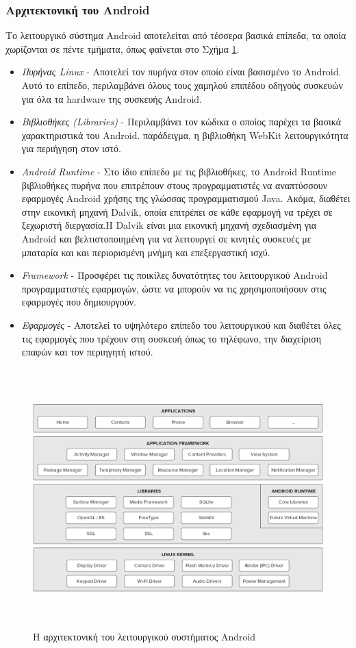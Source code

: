 \documentclass[12pt,twoside,openright]{report}
\begin{document}
\subsubsection{Αρχιτεκτονική του \lt Android\gt}
Το λειτουργικό σύστημα \lt Android \gt αποτελείται από τέσσερα βασικά επίπεδα, τα οποία χωρίζονται σε πέντε τμήματα, όπως φαίνεται στο Σχήμα \ref{fig:androidArc}\cite{Lee:2011}.
\begin{itemize}
\item\emph{Πυρήνας \lt Linux\gt} - Αποτελεί τον πυρήνα στον οποίο είναι βασισμένο το \lt Android\gt. Αυτό το επίπεδο, περιλαμβάνει όλους τους χαμηλού επιπέδου οδηγούς συσκευών για όλα τα \lt hardware  της συσκευής \lt Android\gt.
\item\emph{Βιβλιοθήκες \lt (Libraries)\gt} - Περιλαμβάνει τον κώδικα ο οποίος παρέχει τα βασικά χαρακτηριστικά του \lt Android.  παράδειγμα, η βιβλιοθήκη \lt WebKit  λειτουργικότητα για περιήγηση στον ιστό.
\item\emph{\lt Android Runtime\gt} - Στο ίδιο επίπεδο με τις βιβλιοθήκες, το \lt Android Runtime  βιβλιοθήκες πυρήνα που επιτρέπουν στους προγραμματιστές να αναπτύσσουν εφαρμογές \lt Android  χρήσης της γλώσσας προγραμματισμού \lt Java\gt. Ακόμα, διαθέτει στην εικονική μηχανή \lt Dalvik,  οποία επιτρέπει σε κάθε εφαρμογή να τρέχει σε ξεχωριστή διεργασία.Η Dalvik είναι μια εικονική μηχανή σχεδιασμένη για Android και βελτιστοποιημένη για να λειτουργεί σε κινητές συσκευές με μπαταρία και και περιορισμένη μνήμη και επεξεργαστική ισχύ. 
\item\emph{\lt Framework } - Προσφέρει τις ποικίλες δυνατότητες του λειτουργικού \lt Android  προγραμματιστές εφαρμογών, ώστε να μπορούν να τις χρησιμοποιήσουν στις εφαρμογές που δημιουργούν. 
\item\emph{Εφαρμογές} - Αποτελεί το υψηλότερο επίπεδο του λειτουργικού και διαθέτει όλες τις εφαρμογές που τρέχουν στη συσκευή όπως το τηλέφωνο, την διαχείριση επαφών και τον περιηγητή ιστού.
\end{itemize}
\begin{figure}[H]
\centering
\includegraphics[height=10cm]{images/android_arc}
\caption{Η αρχιτεκτονική του λειτουργικού συστήματος \lt Android\gt}
\label{fig:androidArc}
\end{figure}
\end{document}
